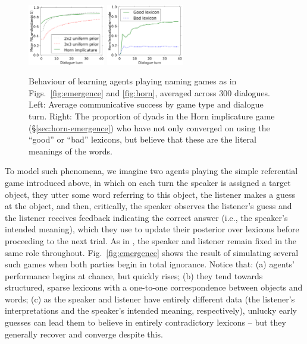 \documentclass{article} %
\begin{document}
\begin{figure}[t]
\centering
\includegraphics[width=0.3\textwidth]{figures/emergence-average.pdf}
\hspace{0.5in}
\includegraphics[width=0.3\textwidth]{figures/emergence-horn-average.pdf}
\caption{\label{fig:emergence-average} Behaviour of learning agents playing naming games as in Figs.~\ref{fig:emergence} and \ref{fig:horn}, averaged across 300 dialogues. Left: Average communicative success by game type and dialogue turn. Right: The proportion of dyads in the Horn implicature game (\S\ref{sec:horn-emergence}) who have not only converged on using the ``good'' or ``bad'' lexicons, but believe that these are the literal meanings of the words.}
\end{figure}

To model such phenomena, we imagine two agents playing the simple referential game introduced above, in which on each turn the speaker is assigned a target object, they utter some word referring to this object, the listener makes a guess at the object, and then, critically, the speaker observes the listener's guess and the listener receives feedback indicating the correct answer (i.e., the speaker's intended meaning), which they use to update their posterior over lexicons before proceeding to the next trial. As in \cite{krauss1964,clark1986}, the speaker and listener remain fixed in the same role throughout. Fig.~\ref{fig:emergence} shows the result of simulating several such games when both parties begin in total ignorance. Notice that: (a) agents' performance begins at chance, but quickly rises; (b) they tend towards structured, sparse lexicons with a one-to-one correspondence between objects and words; (c) as the speaker and listener have entirely different data (the listener's interpretations and the speaker's intended meaning, respectively), unlucky early guesses can lead them to believe in entirely contradictory lexicons -- but they generally recover and converge despite this.
\end{document}
